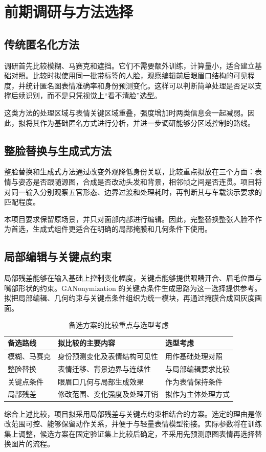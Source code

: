 \section{前期调研与方法选择}
\label{sec:related}
\subsection{传统匿名化方法}
调研首先比较模糊、马赛克和遮挡。它们不需要额外训练，计算量小，适合建立基础对照。比较时拟使用同一批带标签的人脸，观察编辑前后眼眉口结构的可见程度，并统计匿名图表情准确率和身份预测变化。这样可以判断简单处理是否足以支撑后续识别，而不是只凭视觉上“看不清脸”选型。

这类方法的处理区域与表情关键区域重叠，强度增加时两类信息会一起减弱。因此，拟将其作为基础匿名方式进行分析，并进一步调研能够分区域控制的路线。

\subsection{整脸替换与生成式方法}
整脸替换和生成式方法通过改变外观降低身份关联，比较重点拟放在三个方面：表情与姿态是否跟随源图，合成是否改动头发和背景，相邻帧之间是否连贯。项目将对同一输入分别观察五官形态、边界过渡和处理耗时，再判断其与车载演示要求的匹配程度。

本项目要求保留原场景，并只对面部内部进行编辑。因此，完整替换整张人脸不作为首选，生成式组件更适合在明确的局部掩膜和几何条件下使用。

\subsection{局部编辑与关键点约束}
局部残差能够在输入基础上控制变化幅度，关键点能够提供眼睛开合、眉毛位置与嘴部形状的约束。GANonymization 的关键点条件生成思路为这一选择提供参考\cite{ganonymization}。拟把局部编辑、几何约束与关键点条件组织为统一模块，再通过掩膜合成回灰度画面。

\begin{table}[htbp]
\centering
\caption{备选方案的比较重点与选型考虑}
\label{tab:method_compare}
\begin{tabularx}{\linewidth}{@{}lXX@{}}
\toprule
备选路线 & 拟比较的主要内容 & 选型考虑\\
\midrule
模糊、马赛克 & 身份预测变化及表情结构可见性 & 用作基础处理对照\\
整脸替换 & 表情迁移、背景边界与连续性 & 与局部编辑要求比较\\
关键点条件 & 眼眉口几何与局部生成效果 & 作为表情保持条件\\
局部残差 & 修改范围、变化强度及处理开销 & 拟作为主体处理方式\\
\bottomrule
\end{tabularx}
\end{table}

综合上述比较，项目拟采用局部残差与关键点约束相结合的方案。选定的理由是修改范围可控、能够保留动作关系，并便于与轻量表情模型衔接。实际参数将在训练集上调整，候选方案在固定验证集上比较后确定，不采用先预测原图表情再选择替换图片的流程。

